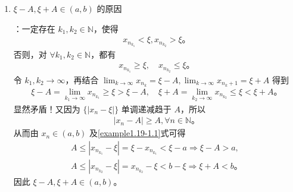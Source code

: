 \documentclass[lang=cn,newtx,10pt,scheme=chinese]{../Template/elegantbook}
\begin{document}
\begin{remark}
\begin{enumerate}[(1)]
\item \hypertarget{xi-A,xi+A在(a,b)中的原因证明}{$\xi - A, \xi + A \in (a, b)$ 的原因}：一定存在 $k_1, k_2 \in \mathbb{N}$，使得
\begin{align}
x_{n_{k_1}} < \xi, x_{n_{k_2}} > \xi。 \label{example1.19-1.1}
\end{align}
否则，对 $\forall k_1, k_2 \in \mathbb{N}$，都有
\begin{align*}
x_{n_{k_1}} \geqslant \xi, \quad x_{n_{k_2}} \leqslant \xi。
\end{align*}
令 $k_1, k_2 \to \infty$，再结合 $\lim_{k \to \infty} x_{n_k} = \xi - A, \lim_{k \to \infty} x_{n_k+1} = \xi + A$ 得到
\begin{align*}
\xi - A = \lim_{k_1 \to \infty} x_{n_{k_1}} \geqslant \xi > \xi - A, \quad \xi + A = \lim_{k_2 \to \infty} x_{n_{k_2}} \leqslant \xi < \xi + A。
\end{align*}
显然矛盾！又因为 $\{|x_n - \xi|\}$ 单调递减趋于 $A$，所以
\begin{align*}
|x_n - A| \geqslant A, \forall n \in \mathbb{N}。
\end{align*}
从而由 $x_n \in (a, b)$ 及\eqref{example1.19-1.1}式可得
\begin{align*}
A \leqslant |x_{n_{k_1}} - \xi| = \xi - x_{n_{k_1}} < \xi - a \Rightarrow \xi - A > a,
\\
A \leqslant |x_{n_{k_2}} - \xi| = x_{n_{k_2}} - \xi < b - \xi \Rightarrow \xi + A < b。
\end{align*}
因此 $\xi - A, \xi + A \in (a, b)$。
\end{enumerate}
\end{remark}
\end{document}
